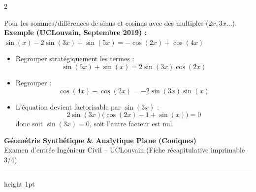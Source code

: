 {\begin{multicols}{2}
\vspace{6pt}

\vspace{2pt}
\noindent Pour les sommes/différences de sinus et cosinus avec des multiples ($2x, 3x\dots$).\\
\textbf{Exemple (UCLouvain, Septembre 2019) :}\\
$\sin(x) - 2\sin(3x) + \sin(5x) = -\cos(2x) + \cos(4x)$
\begin{itemize}[leftmargin=1.2em, itemsep=2pt, topsep=2pt]
    \item Regrouper stratégiquement les termes :
    \[
        \sin(5x) + \sin(x) = 2\sin(3x)\cos(2x)
    \]
    \item Regrouper :
    \[
        \cos(4x) - \cos(2x) = -2\sin(3x)\sin(x)
    \]
    \item L'équation devient factorisable par $\sin(3x)$ :
    \[
        2\sin(3x)\bigl(\cos(2x) - 1 + \sin(x)\bigr) = 0
    \]
    donc soit $\sin(3x) = 0$, soit l'autre facteur est nul.
\end{itemize}

\end{multicols}
}

\newpage
\thispagestyle{plain}

\begin{center}
    {\LARGE\bfseries\color{uclblue} Géométrie Synthétique \& Analytique Plane (Coniques)}\\[2pt]
    {\small\color{darkgray} Examen d'entrée Ingénieur Civil -- UCLouvain (Fiche récapitulative imprimable 3/4)}
    \vspace{2pt}
    \hrule height 1pt
\end{center}
\vspace{-6pt}

